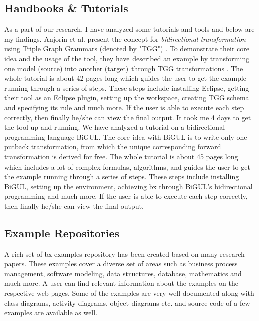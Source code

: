 \subsection{Handbooks \& Tutorials}\label{subsec:handbook}
As a part of our research, I have analyzed some tutorials and tools and below are my findings.
\newline\newline Anjorin et al.\cite{emoflon-part4} present the concept for \textit{bidirectional transformation} using Triple Graph Grammars (denoted by "TGG") \cite{tgg}. To demonstrate their core idea and the usage of the tool, they have described an example by transforming one model (source) into another (target) through TGG transformations \cite{tgg}\cite{bx-tgg}. The whole tutorial is about 42 pages long which guides the user to get the example running through a series of steps. These steps include installing \ac{Eclipse}, getting their tool as an Eclipse plugin, setting up the workspace, creating TGG schema and specifying its rule and much more. If the user is able to execute each step correctly, then finally he/she can view the final output. It took me 4 days to get the tool up and running.
\newline\newline We have analyzed a tutorial\cite{bigul-tutorial} on a bidirectional programming language BiGUL\cite{bigul}. The core idea with BiGUL is to write only one putback transformation, from which the unique corresponding forward transformation is derived for free. The whole tutorial is about 45 pages long which includes a lot of complex formulas, algorithms, and guides the user to get the example running through a series of steps. These steps include installing BiGUL, setting up the environment, achieving bx through BiGUL's bidirectional programming and much more. If the user is able to execute each step correctly, then finally he/she can view the final output. 

\subsection{Example Repositories}\label{subsec:examplerep}
A rich set of bx examples repository \cite{bx-examples} has been created based on many research papers. These examples cover a diverse set of areas such as business process management, software modeling, data structures, database, mathematics and much more.
\newline\newline A user can find relevant information about the examples on the respective web pages. Some of the examples are very well documented along with class diagrams, activity diagrams, object diagrams etc. and source code of a few examples are available as well.

